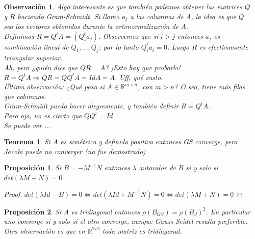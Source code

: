 \documentclass[10pt,a4paper,final]{report}
\newtheorem{theorem}{Teorema}
\newtheorem{proposition}{Proposición}
\newtheorem{observation}{Observación}
\begin{document}
{\begin{observation}
	Algo interesante es que también podemos obtener las matrices $Q$ y $R$ haciendo Gram-Schmidt. Si llamo $a_j$ a las columnas de $A$, la idea es que $Q$ sea los vectores obtenidos durante la ortonormalización de $A$.\\
	
	Definimos $R = Q^t A = (Q_i^t a_j)$. Observemos que si $i>j$ entonces $a_j$ es combinación lineal de $Q_1,...,Q_j$; por lo tanto $Q_i^t a_j = 0$. Luego $R$ es efectivamente triangular superior.\\
	
Ah, pero ¿quién dice que $QR = A$? ¡Esto hay que probarlo! $R = Q^t A \Rightarrow Q R = Q Q^t A = Id A = A$. Uff, qué susto.\\

Última observación: ¿Qué pasa si $A \in \mathbb{R}^{m\times n}$, con $m>n$? O sea, tiene más filas que columnas.\\

Gram-Schmidt puedo hacer alegremente, y también definir $R= Q^t A$.\\

Pero ojo, no es cierto que $QQ^t = Id$\\

Se puede ver ...


\end{observation}




\begin{theorem}

 Si $A$ es simétrica y definida positiva entonces GS converge, pero Jacobi puede no converger (no fue demostrado)
\end{theorem}

\begin{proposition}Si $B=-M^{-1}N$ entonces $\lambda$ autovalor de $B$ si y solo si $det(\lambda M + N) = 0$
\end{proposition}

\begin{proof}

$det(\lambda Id - B) = 0 \Leftrightarrow det(\lambda Id + M^{-1}N ) = 0 \Leftrightarrow det(\lambda M + N) = 0$
\end{proof}

\begin{proposition}Si $A$ es tridiagonal entonces $\rho(B_{GS}) = \rho(B_J)^2$. En particular uno converge si y solo si el otro converge, aunque Gauss-Seidel resulta preferible. Otra observación es que en $\mathbb{R}^{2x2}$ toda matriz es tridiagonal.
\end{proposition}

}
\end{document}
